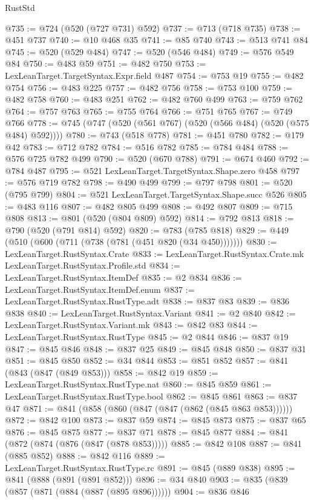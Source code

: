 \begin{lexlean}{RustStd}
\begin{coremodule}
@735 := @724 (@520 (@727 @731) @592)
@737 := @713 (@718 @735)
@738 := @451 @737
@740 := @10 @468 @35
@741 := @85 @740
@743 := @513 @741 @84
@745 := @520 (@529 @484)
@747 := @520 (@546 @484)
@749 := @576 @549 @84
@750 := @483 @59
@751 := @482 @750
@753 := LexLeanTarget.TargetSyntax.Expr.field @487
@754 := @753 @19
@755 := @482 @754
@756 := @483 @225
@757 := @482 @756
@758 := @753 @100
@759 := @482 @758
@760 := @483 @251
@762 := @482 @760 @499
@763 := @759 @762
@764 := @757 @763
@765 := @755 @764
@766 := @751 @765
@767 := @749 @766
@778 := @745 (@747 (@520 (@561 @767) (@520 (@566 @484) (@520 (@575 @484) @592))))
@780 := @743 (@518 @778)
@781 := @451 @780
@782 := @179 @42
@783 := @712 @782
@784 := @516 @782
@785 := @784 @484
@788 := @576 @725 @782 @499
@790 := @520 (@670 @788)
@791 := @674 @460
@792 := @784 @487
@795 := @521 LexLeanTarget.TargetSyntax.Shape.zero @458
@797 := @576 @719 @782
@798 := @490 @499
@799 := @797 @798
@801 := @520 (@795 @799)
@804 := @521 LexLeanTarget.TargetSyntax.Shape.succ @526
@805 := @483 @116
@807 := @482 @805 @499
@808 := @492 @807
@809 := @715 @808
@813 := @801 (@520 (@804 @809) @592)
@814 := @792 @813
@818 := @790 (@520 (@791 @814) @592)
@820 := @783 (@785 @818)
@829 := @449 (@510 (@600 (@711 (@738 (@781 (@451 @820 (@34 @450)))))))
@830 := LexLeanTarget.RustSyntax.Crate
@833 := LexLeanTarget.RustSyntax.Crate.mk LexLeanTarget.RustSyntax.Profile.std
@834 := LexLeanTarget.RustSyntax.ItemDef
@835 := @2 @834
@836 := LexLeanTarget.RustSyntax.ItemDef.enum
@837 := LexLeanTarget.RustSyntax.RustType.adt
@838 := @837 @83
@839 := @836 @838
@840 := LexLeanTarget.RustSyntax.Variant
@841 := @2 @840
@842 := LexLeanTarget.RustSyntax.Variant.mk
@843 := @842 @83
@844 := LexLeanTarget.RustSyntax.RustType
@845 := @2 @844
@846 := @837 @19
@847 := @845 @846
@848 := @837 @25
@849 := @845 @848
@850 := @837 @31
@851 := @845 @850
@852 := @34 @844
@853 := @851 @852
@857 := @841 (@843 (@847 (@849 @853)))
@858 := @842 @19
@859 := LexLeanTarget.RustSyntax.RustType.nat
@860 := @845 @859
@861 := LexLeanTarget.RustSyntax.RustType.bool
@862 := @845 @861
@863 := @837 @47
@871 := @841 (@858 (@860 (@847 (@847 (@862 (@845 @863 @853))))))
@872 := @842 @100
@873 := @837 @59
@874 := @845 @873
@875 := @837 @65
@876 := @845 @875
@877 := @837 @71
@878 := @845 @877
@884 := @841 (@872 (@874 (@876 (@847 (@878 @853)))))
@885 := @842 @108
@887 := @841 (@885 @852)
@888 := @842 @116
@889 := LexLeanTarget.RustSyntax.RustType.rc
@891 := @845 (@889 @838)
@895 := @841 (@888 (@891 (@891 @852)))
@896 := @34 @840
@903 := @835 (@839 (@857 (@871 (@884 (@887 (@895 @896))))))
@904 := @836 @846

\end{coremodule}
\end{lexlean}
